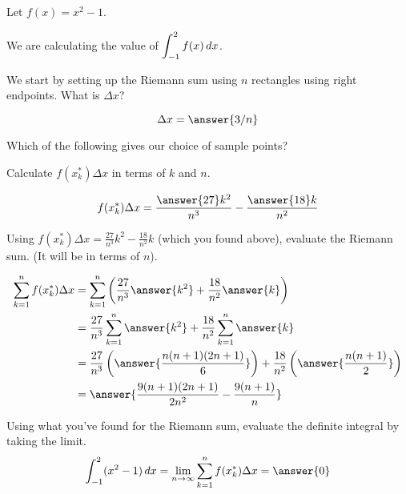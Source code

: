 \documentclass{ximera}
\author{Bobby Ramsey}
\begin{document}
Let $f(x) = x^2-1$. 
		\begin{center}
		\end{center}

We are calculating the value of $\displaystyle \int_{-1}^{2} f(x) \mathop{}\!d x$.


\begin{exercise}
	We start by setting up the Riemann sum using $n$ rectangles using right endpoints.
	What is $\Delta x$?
	
	\[ \Delta x = \answer{3/n} \]
	\begin{exercise}
		Which of the following gives our choice of sample points?
		\begin{multipleChoice}
		\end{multipleChoice}
		
		\begin{exercise}
			Calculate $f(x_k^*) \Delta x$ in terms of $k$ and $n$.
			
			\[ f(x_k^*) \Delta x = \frac{\answer{27}k^2}{n^3}-\frac{\answer{18}k}{n^2} \]
			\begin{exercise}
				Using $f(x_k^*)\Delta x = \frac{27}{n^3}k^2 - \frac{18}{n^2}k$ (which you found above), evaluate the Riemann sum.  (It will be in terms of $n$).
				
				\begin{align*}
					\sum_{k=1}^{n} f(x_k^*)\Delta x &=  \sum_{k=1}^{n} \left(\frac{27}{n^3}\answer{k^2} + \frac{18}{n^2}\answer{k}\right)\\
						&= \frac{27}{n^3} \sum_{k=1}^{n} \answer{k^2} + \frac{18}{n^2} \sum_{k=1}^{n} \answer{k}\\
						&= \frac{27}{n^3} \left( \answer{\frac{n(n+1)(2n+1)}{6}}\right) + \frac{18}{n^2} \left( \answer{\frac{n(n+1)}{2}}\right)\\
						&= \answer{\frac{9(n+1)(2n+1)}{2n^2}-\frac{9(n+1)}{n}}
				\end{align*}
				
				\begin{exercise}
					Using what you've found for the Riemann sum, evaluate the definite integral by taking the limit.
					\[ \int_{-1}^{2} (x^2-1) \d x = \lim_{n\to\infty} \sum_{k=1}^{n} f(x_k^*)\Delta x = \answer{0} \]
				\end{exercise}
			\end{exercise}
		\end{exercise}
	\end{exercise}
\end{exercise}
\end{document}
